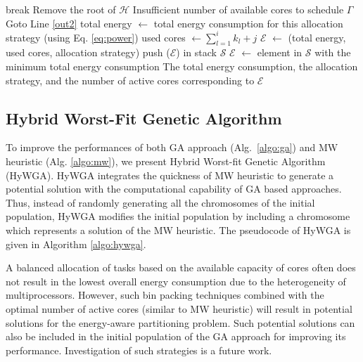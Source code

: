 \documentclass[conference]{IEEEtran}
\begin{document}
\begin{algorithm}
\begin{algorithmic}[1]
					\STATE break 
					\ELSE
					\STATE Remove the root of  $\mathcal{H}$
					\ENDIF
				\ENDWHILE  \label{end-inner}
				 \label{stop} 
					\STATE Insufficient number of available cores to schedule $\Gamma$ 
					\STATE Goto Line \ref{out2}
				\ENDIF
			\ENDIF 
		\ENDFOR \label{worst-end}
		\STATE total energy $\leftarrow$ total energy consumption for this allocation strategy (using Eq. \ref{eq:power}) \label{tpower}
		\STATE \label{core} used cores $\leftarrow \sum_{l=1}^{i}k_l + j$ 
		\STATE  \label{triplet} $\mathcal{E}$ $\leftarrow$  (total energy, used cores, allocation strategy) 
		\STATE \label{stack} push ($\mathcal{E}$) in stack $\mathcal{S}$ 
	\ENDFOR
\ENDFOR
\STATE \label{out2}  $\mathcal{E}$ $\leftarrow$ element in   $\mathcal{S}$ with the minimum total energy consumption  
\PRINT  The total energy consumption, the allocation  strategy, and the number of active cores corresponding to  $\mathcal{E}$  \label{out1}
\end{algorithmic}
\end{algorithm}


\subsection{Hybrid Worst-Fit Genetic Algorithm} %

To improve the performances of both GA approach (Alg.~\ref{algo:ga}) and MW heuristic (Alg. \ref{algo:mw}),
we present Hybrid Worst-fit Genetic Algorithm (HyWGA). 
HyWGA integrates the quickness of MW heuristic to generate a potential solution with the computational capability
of GA based approaches. %
Thus, instead of randomly generating all the chromosomes of the initial
population, HyWGA modifies the initial population by including a chromosome which represents a solution of the MW heuristic.
The pseudocode of HyWGA is given in Algorithm \ref{algo:hywga}.

A balanced allocation of tasks based on the available capacity of cores often does not result in the lowest overall energy consumption due to the heterogeneity of multiprocessors. However, such bin packing techniques combined with the optimal number of active cores (similar to MW heuristic)
will result in  potential solutions for the energy-aware partitioning problem. Such potential solutions can also be included in the initial population 
of the GA approach for improving its performance.
Investigation of such strategies %
is a future work.
\end{document}

